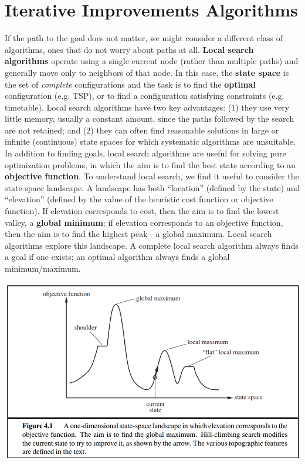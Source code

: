 \section{Iterative Improvements Algorithms}
If the path to the goal does not matter, we might consider a different class of algorithms, ones that do not worry about paths at all. \textbf{Local search algorithms} operate using a single current node (rather than multiple paths) and generally move only to neighbors of that node. In this case, the \textbf{state space} is the set of \textit{complete} configurations and the task is to find the \textbf{optimal} configuration (e.g. TSP), or to find a configuration satisfying constraints (e.g. timetable).\newline\newline
Local search algorithms have two key advantages: (1) they use very little memory, usually a constant amount, since the paths followed by the search are not retained; and (2) they can often find reasonable solutions in large or infinite (continuous) state spaces for which systematic algorithms are unsuitable.\newline\newline
In addition to finding goals, local search algorithms are useful for solving pure optimization problems, in which the aim is to find the best state according to an \textbf{objective function}.\newline\newline
To understand local search, we find it useful to consider the state-space landscape. A landscape has both “location” (defined by the state) and “elevation” (defined by the value of the heuristic cost function or objective function). If elevation corresponds to cost, then the aim is to find the lowest valley, a \textbf{global minimum}; if elevation corresponds to an objective function, then the aim is to find the highest peak—a global maximum.  Local search algorithms explore this landscape. A complete local search algorithm always finds a goal if one exists; an optimal algorithm always finds a global minimum/maximum.
\begin{center}
    \includegraphics[scale=0.8]{images/state landscape.png}
\end{center}

